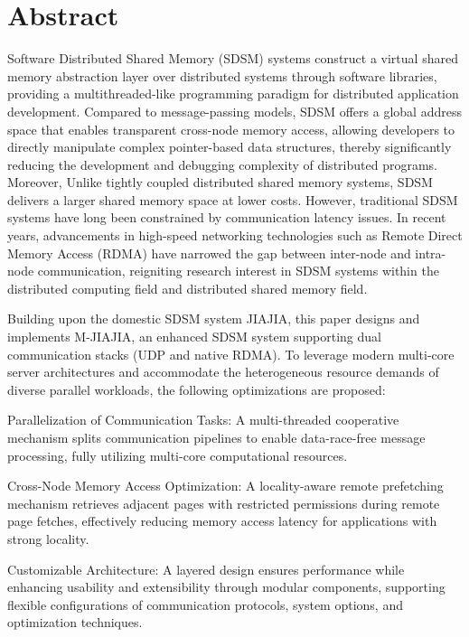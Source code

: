 \intobmk\chapter*{Abstract}%
Software Distributed Shared Memory (SDSM) systems construct a virtual shared memory abstraction layer over distributed systems through software libraries, providing a multithreaded-like programming paradigm for distributed application development. Compared to message-passing models, SDSM offers a global address space that enables transparent cross-node memory access, allowing developers to directly manipulate complex pointer-based data structures, thereby significantly reducing the development and debugging complexity of distributed programs. Moreover, Unlike tightly coupled distributed shared memory systems, SDSM delivers a larger shared memory space at lower costs. However, traditional SDSM systems have long been constrained by communication latency issues. In recent years, advancements in high-speed networking technologies such as Remote Direct Memory Access (RDMA) have narrowed the gap between inter-node and intra-node communication, reigniting research interest in SDSM systems within the distributed computing field and distributed shared memory field.

Building upon the domestic SDSM system JIAJIA, this paper designs and implements M-JIAJIA, an enhanced SDSM system supporting dual communication stacks (UDP and native RDMA). To leverage modern multi-core server architectures and accommodate the heterogeneous resource demands of diverse parallel workloads, the following optimizations are proposed:

\begin{enumerate}[label=\arabic*.]{
    \item Parallelization of Communication Tasks: A multi-threaded cooperative mechanism splits communication pipelines to enable data-race-free message processing, fully utilizing multi-core computational resources.

    \item Cross-Node Memory Access Optimization: A locality-aware remote prefetching mechanism retrieves adjacent pages with restricted permissions during remote page fetches, effectively reducing memory access latency for applications with strong locality.

    \item Customizable Architecture: A layered design
    ensures performance while enhancing usability and extensibility through modular components, supporting flexible configurations of communication protocols, system options, and optimization techniques.
}
\end{enumerate}



